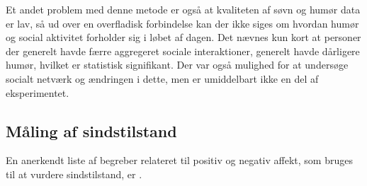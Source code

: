 Et andet problem med denne metode er også at kvaliteten af søvn og humør data er lav, så ud over en overfladisk forbindelse kan der ikke siges om hvordan humør og social aktivitet forholder sig i løbet af dagen.
Det nævnes kun kort at personer der generelt havde færre aggregeret sociale interaktioner, generelt havde dårligere humør, hvilket er statistisk signifikant.
Der var også mulighed for at undersøge socialt netværk og ændringen i dette, men er umiddelbart ikke en del af eksperimentet.

\subsection{Måling af sindstilstand}
En anerkendt liste af begreber relateret til positiv og negativ affekt, som bruges til at vurdere sindstilstand, er \citet{panas}.

